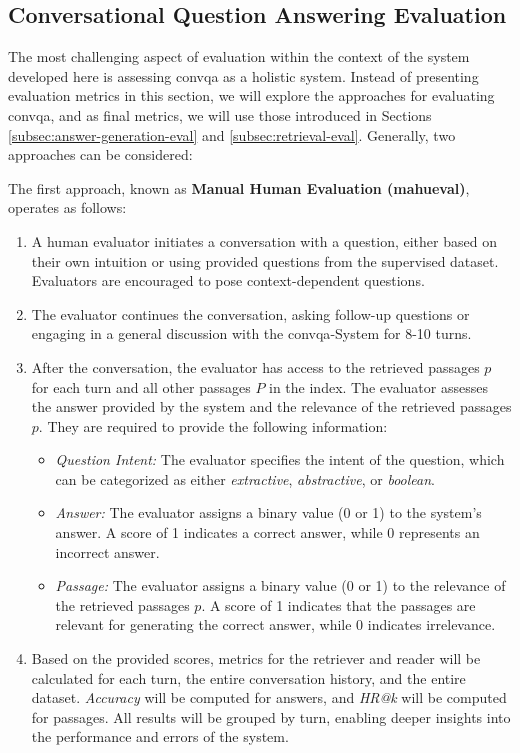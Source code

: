 \subsection{Conversational Question Answering Evaluation}
\label{subsec:convqa-eval}

The most challenging aspect of evaluation within the context of the system developed here is assessing \gls{convqa} as a holistic system. Instead of presenting evaluation metrics in this section, we will explore the approaches for evaluating \gls{convqa}, and as final metrics, we will use those introduced in Sections \ref{subsec:answer-generation-eval} and \ref{subsec:retrieval-eval}. Generally, two approaches can be considered: 

The first approach, known as \textbf{Manual Human Evaluation (\gls{mahueval})}, operates as follows:

\begin{enumerate}
    \item A human evaluator initiates a conversation with a question, either based on their own intuition or using provided questions from the supervised dataset. Evaluators are encouraged to pose context-dependent questions.
    \item The evaluator continues the conversation, asking follow-up questions or engaging in a general discussion with the \gls{convqa}-System for 8-10 turns.
    \item After the conversation, the evaluator has access to the retrieved passages $p$ for each turn and all other passages $P$ in the index. The evaluator assesses the answer provided by the system and the relevance of the retrieved passages $p$. They are required to provide the following information:
        \begin{itemize}
            \item \textit{Question Intent:} The evaluator specifies the intent of the question, which can be categorized as either \textit{extractive}, \textit{abstractive}, or \textit{boolean}.
            \item \textit{Answer:} The evaluator assigns a binary value (0 or 1) to the system's answer. A score of 1 indicates a correct answer, while 0 represents an incorrect answer.
            \item \textit{Passage:} The evaluator assigns a binary value (0 or 1) to the relevance of the retrieved passages $p$. A score of 1 indicates that the passages are relevant for generating the correct answer, while 0 indicates irrelevance.
        \end{itemize}
    \item Based on the provided scores, metrics for the retriever and reader will be calculated for each turn, the entire conversation history, and the entire dataset. \textit{Accuracy} will be computed for answers, and \textit{HR@k} will be computed for passages. All results will be grouped by turn, enabling deeper insights into the performance and errors of the system.
\end{enumerate}

